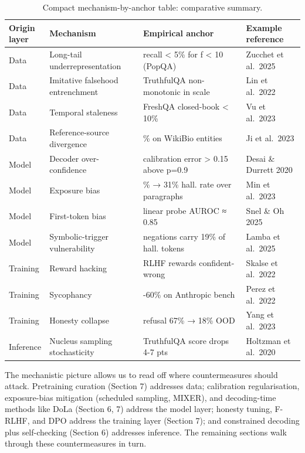 \documentclass{article}
\begin{document}
\begin{table}[t]
\centering
\caption{Compact mechanism-by-anchor table: comparative summary.}
\label{tab:compact-mechanism-by-anchor-table}
\begin{tabular}{>{\raggedright\arraybackslash}p{0.1200\linewidth}
  >{\raggedright\arraybackslash}p{0.3200\linewidth}
  >{\raggedright\arraybackslash}p{0.3600\linewidth}
  >{\raggedright\arraybackslash}p{0.2000\linewidth}}
\toprule
Origin layer & Mechanism & Empirical anchor & Example reference \\
\midrule
Data & Long-tail underrepresentation & recall \textless{} 5\% for f \textless{} 10 (PopQA) & Zucchet et al.~2025 \\
Data & Imitative falsehood entrenchment & TruthfulQA non-monotonic in scale & Lin et al.~2022 \\
Data & Temporal staleness & FreshQA closed-book \textless{} 10\% & Vu et al.~2023 \\
Data & Reference-source divergence & 23\% on WikiBio entities & Ji et al.~2023 \\
Model & Decoder over-confidence & calibration error \textgreater{} 0.15 above p=0.9 & Desai \& Durrett 2020 \\
Model & Exposure bias & 12\% → 31\% hall. rate over paragraphs & Min et al.~2023 \\
Model & First-token bias & linear probe AUROC ≈ 0.85 & Snel \& Oh 2025 \\
Model & Symbolic-trigger vulnerability & negations carry 19\% of hall. tokens & Lamba et al.~2025 \\
Training & Reward hacking & RLHF rewards confident-wrong & Skalse et al.~2022 \\
Training & Sycophancy & 40-60\% on Anthropic bench & Perez et al.~2022 \\
Training & Honesty collapse & refusal 67\% → 18\% OOD & Yang et al.~2023 \\
Inference & Nucleus sampling stochasticity & TruthfulQA score drops 4-7 pts & Holtzman et al.~2020 \\
\end{tabular}
\end{table}

The mechanistic picture allows us to read off where countermeasures should attack. Pretraining curation (Section 7) addresses data; calibration regularisation, exposure-bias mitigation (scheduled sampling, MIXER), and decoding-time methods like DoLa (Section 6, 7) address the model layer; honesty tuning, F-RLHF, and DPO address the training layer (Section 7); and constrained decoding plus self-checking (Section 6) addresses inference. The remaining sections walk through these countermeasures in turn.
\end{document}
